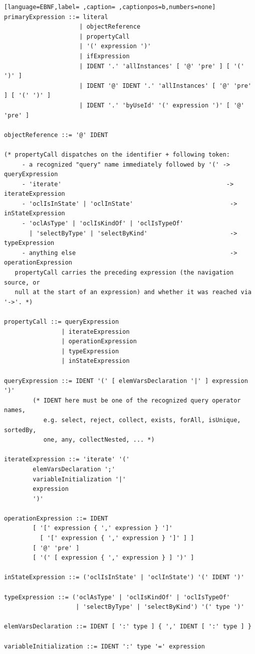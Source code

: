 \documentclass[11pt,twoside,a4paper]{book}
\begin{document}
\begin{lstlisting}[language=EBNF,label= ,caption= ,captionpos=b,numbers=none]
primaryExpression ::= literal
                     | objectReference
                     | propertyCall
                     | '(' expression ')'
                     | ifExpression
                     | IDENT '.' 'allInstances' [ '@' 'pre' ] [ '(' ')' ]
                     | IDENT '@' IDENT '.' 'allInstances' [ '@' 'pre' ] [ '(' ')' ]
                     | IDENT '.' 'byUseId' '(' expression ')' [ '@' 'pre' ]

objectReference ::= '@' IDENT

(* propertyCall dispatches on the identifier + following token:
     - a recognized "query" name immediately followed by '(' -> queryExpression
     - 'iterate'                                              -> iterateExpression
     - 'oclIsInState' | 'oclInState'                           -> inStateExpression
     - 'oclAsType' | 'oclIsKindOf' | 'oclIsTypeOf'
       | 'selectByType' | 'selectByKind'                       -> typeExpression
     - anything else                                           -> operationExpression
   propertyCall carries the preceding expression (the navigation source, or
   null at the start of an expression) and whether it was reached via '->'. *)

propertyCall ::= queryExpression
                | iterateExpression
                | operationExpression
                | typeExpression
                | inStateExpression

queryExpression ::= IDENT '(' [ elemVarsDeclaration '|' ] expression ')'
        (* IDENT here must be one of the recognized query operator names,
           e.g. select, reject, collect, exists, forAll, isUnique, sortedBy,
           one, any, collectNested, ... *)

iterateExpression ::= 'iterate' '('
        elemVarsDeclaration ';'
        variableInitialization '|'
        expression
        ')'

operationExpression ::= IDENT
        [ '[' expression { ',' expression } ']'
          [ '[' expression { ',' expression } ']' ] ]
        [ '@' 'pre' ]
        [ '(' [ expression { ',' expression } ] ')' ]

inStateExpression ::= ('oclIsInState' | 'oclInState') '(' IDENT ')'

typeExpression ::= ('oclAsType' | 'oclIsKindOf' | 'oclIsTypeOf'
                    | 'selectByType' | 'selectByKind') '(' type ')'

elemVarsDeclaration ::= IDENT [ ':' type ] { ',' IDENT [ ':' type ] }

variableInitialization ::= IDENT ':' type '=' expression


\end{lstlisting}
\end{document}

